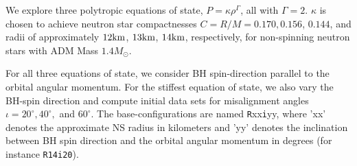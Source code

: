 We explore three polytropic equations of state, $P=\kappa\rho^\Gamma$, all with
$\Gamma=2$. $\kappa$ is chosen to achieve neutron star compactnesses
$C=R/M=0.170, 0.156$, $0.144$, and radii of approximately
$12{\rm km}$, $13{\rm km}$, $14{\rm km}$, respectively, for
non-spinning neutron stars with ADM Mass $1.4M_{\odot}$. 

For all three equations of state, we consider BH spin-direction
parallel to the orbital angular momentum. For the stiffest equation
of state, we also vary the BH-spin direction and compute initial data
sets for misalignment angles $\iota=20^{\circ}, 40^{\circ},$ and
$60^{\circ}$. The base-configurations are named {\tt R}xx{\tt i}yy,
where 'xx' denotes the approximate NS radius in kilometers and 'yy' denotes
the inclination between BH spin direction and the orbital angular
momentum in degrees (for instance {\tt R14i20}).

